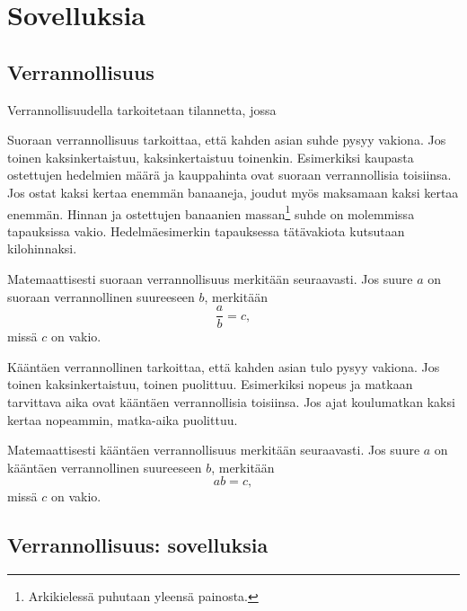 %
\part{Sovelluksia}
%
%
\chapter{Verrannollisuus}

Verrannollisuudella tarkoitetaan tilannetta, jossa 

Suoraan verrannollisuus tarkoittaa, että kahden asian suhde pysyy vakiona. Jos toinen kaksinkertaistuu, kaksinkertaistuu toinenkin. Esimerkiksi kaupasta ostettujen hedelmien määrä ja kauppahinta ovat suoraan verrannollisia toisiinsa. Jos ostat kaksi kertaa enemmän banaaneja, joudut myös maksamaan kaksi kertaa enemmän. Hinnan ja ostettujen banaanien massan\footnote{Arkikielessä puhutaan yleensä painosta.} suhde on molemmissa tapauksissa vakio. Hedelmäesimerkin tapauksessa tätävakiota kutsutaan kilohinnaksi.

Matemaattisesti suoraan verrannollisuus merkitään seuraavasti. Jos suure $a$ on suoraan verrannollinen suureeseen $b$, merkitään
\begin{equation}
\frac{a}{b}=c,
\end{equation}
missä $c$ on vakio.

Kääntäen verrannollinen tarkoittaa, että kahden asian tulo pysyy vakiona. Jos toinen kaksinkertaistuu, toinen puolittuu. Esimerkiksi nopeus ja matkaan tarvittava aika ovat kääntäen verrannollisia toisiinsa. Jos ajat koulumatkan kaksi kertaa nopeammin, matka-aika puolittuu.

Matemaattisesti kääntäen verrannollisuus merkitään seuraavasti. Jos suure $a$ on kääntäen verrannollinen suureeseen $b$, merkitään
\begin{equation}
ab=c,
\end{equation}
missä $c$ on vakio.


\chapter{Verrannollisuus: sovelluksia}

